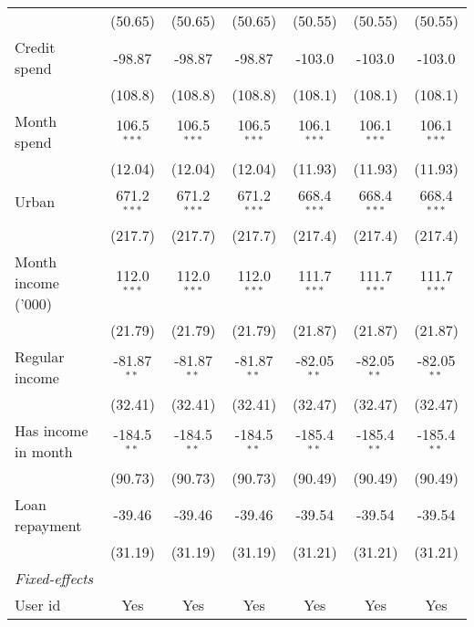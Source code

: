 \begin{table}[htbp]
\begin{footnotesize}
\begin{tabular}{lcccccc}
                             & (50.65)       & (50.65)       & (50.65)       & (50.55)       & (50.55)       & (50.55)\\
         Credit spend        & -98.87        & -98.87        & -98.87        & -103.0        & -103.0        & -103.0\\
                             & (108.8)       & (108.8)       & (108.8)       & (108.1)       & (108.1)       & (108.1)\\
         Month spend         & 106.5$^{***}$ & 106.5$^{***}$ & 106.5$^{***}$ & 106.1$^{***}$ & 106.1$^{***}$ & 106.1$^{***}$\\
                             & (12.04)       & (12.04)       & (12.04)       & (11.93)       & (11.93)       & (11.93)\\
         Urban               & 671.2$^{***}$ & 671.2$^{***}$ & 671.2$^{***}$ & 668.4$^{***}$ & 668.4$^{***}$ & 668.4$^{***}$\\
                             & (217.7)       & (217.7)       & (217.7)       & (217.4)       & (217.4)       & (217.4)\\
         Month income ('000) & 112.0$^{***}$ & 112.0$^{***}$ & 112.0$^{***}$ & 111.7$^{***}$ & 111.7$^{***}$ & 111.7$^{***}$\\
                             & (21.79)       & (21.79)       & (21.79)       & (21.87)       & (21.87)       & (21.87)\\
         Regular income      & -81.87$^{**}$ & -81.87$^{**}$ & -81.87$^{**}$ & -82.05$^{**}$ & -82.05$^{**}$ & -82.05$^{**}$\\
                             & (32.41)       & (32.41)       & (32.41)       & (32.47)       & (32.47)       & (32.47)\\
         Has income in month & -184.5$^{**}$ & -184.5$^{**}$ & -184.5$^{**}$ & -185.4$^{**}$ & -185.4$^{**}$ & -185.4$^{**}$\\
                             & (90.73)       & (90.73)       & (90.73)       & (90.49)       & (90.49)       & (90.49)\\
         Loan repayment      & -39.46        & -39.46        & -39.46        & -39.54        & -39.54        & -39.54\\
                             & (31.19)       & (31.19)       & (31.19)       & (31.21)       & (31.21)       & (31.21)\\
         \midrule \emph{Fixed-effects} &   &   &   &   &   &  \\
         User id             & Yes           & Yes           & Yes           & Yes           & Yes           & Yes\\

\end{tabular}
\end{footnotesize}
\end{table}
